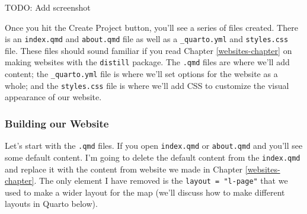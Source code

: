 \documentclass[
]{book}
\begin{document}
TODO: Add screenshot

Once you hit the Create Project button, you'll see a series of files created. There is an \texttt{index.qmd} and \texttt{about.qmd} file as well as a \texttt{\_quarto.yml} and \texttt{styles.css} file. These files should sound familiar if you read Chapter \ref{websites-chapter} on making websites with the \texttt{distill} package. The \texttt{.qmd} files are where we'll add content; the \texttt{\_quarto.yml} file is where we'll set options for the website as a whole; and the \texttt{styles.css} file is where we'll add CSS to customize the visual appearance of our website.

\hypertarget{building-our-website}{%
\subsubsection*{Building our Website}\label{building-our-website}}

Let's start with the \texttt{.qmd} files. If you open \texttt{index.qmd} or \texttt{about.qmd} and you'll see some default content. I'm going to delete the default content from the \texttt{index.qmd} and replace it with the content from website we made in Chapter \ref{websites-chapter}. The only element I have removed is the \texttt{layout\ =\ "l-page"} that we used to make a wider layout for the map (we'll discuss how to make different layouts in Quarto below).
\end{document}
